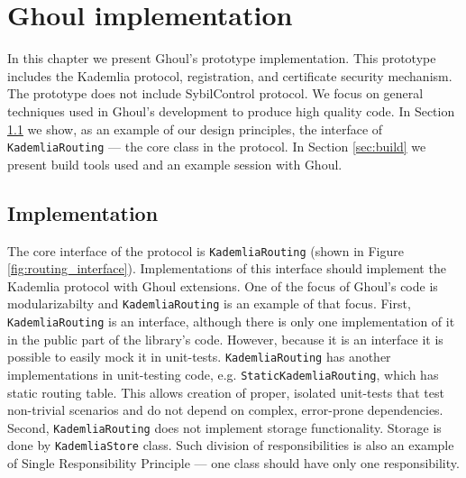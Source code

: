\chapter{Ghoul implementation}
\label{ch:implementation}
In this chapter we present Ghoul's prototype implementation.
This prototype includes the Kademlia protocol, registration, and certificate
security mechanism.
The prototype does not include SybilControl protocol.
We focus on general techniques used in Ghoul's development to produce high
quality code.
In Section \ref{sec:implementation} we show, as an example of our design
principles, the interface of \texttt{KademliaRouting} --- the core class in the
protocol.
In Section \ref{sec:build} we present build tools used and an example session
with Ghoul.

\section{Implementation}
\label{sec:implementation}

The core interface of the protocol is \texttt{KademliaRouting} (shown in Figure
\ref{fig:routing_interface}).
Implementations of this interface should implement the Kademlia protocol with
Ghoul extensions.
One of the focus of Ghoul's code is modularizabilty and \texttt{KademliaRouting}
is an example of that focus.
First, \texttt{KademliaRouting} is an interface, although there is only one
implementation of it in the public part of the library's code.
However, because it is an interface it is possible to easily mock it in
unit-tests.
\texttt{KademliaRouting} has another implementations in unit-testing code, e.g.
\texttt{StaticKademliaRouting}, which has static routing table.
This allows creation of proper, isolated unit-tests that test non-trivial
scenarios and do not depend on complex, error-prone dependencies.
Second, \texttt{KademliaRouting} does not implement storage functionality.
Storage is done by \texttt{KademliaStore} class.
Such division of responsibilities is also an example of Single Responsibility
Principle --- one class should have only one responsibility.

